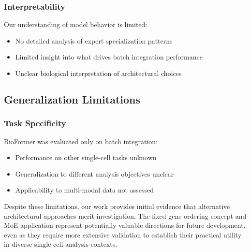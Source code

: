 \subsubsection{Interpretability}
Our understanding of model behavior is limited:
\begin{itemize}
\item No detailed analysis of expert specialization patterns
\item Limited insight into what drives batch integration performance
\item Unclear biological interpretation of architectural choices
\end{itemize}

\subsection{Generalization Limitations}

\subsubsection{Task Specificity}
BioFormer was evaluated only on batch integration:
\begin{itemize}
\item Performance on other single-cell tasks unknown
\item Generalization to different analysis objectives unclear
\item Applicability to multi-modal data not assessed
\end{itemize}



Despite these limitations, our work provides initial evidence that alternative architectural approaches merit investigation. The fixed gene ordering concept and MoE application represent potentially valuable directions for future development, even as they require more extensive validation to establish their practical utility in diverse single-cell analysis contexts.
